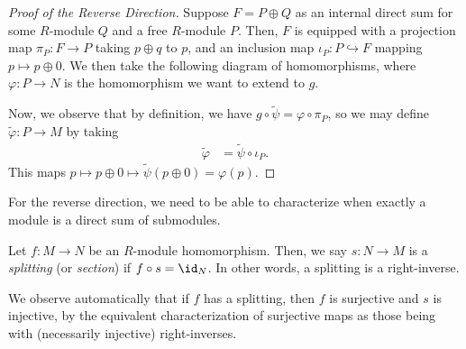 \documentclass[10pt]{mypackage}
\begin{document}
\begin{proof}[Proof of the Reverse Direction]
  Suppose $F = P\oplus Q$ as an internal direct sum for some $R$-module $Q$ and a free $R$-module $P$. Then, $F$ is equipped with a projection map $\pi_P\colon F\rightarrow P$ taking $p\oplus q$ to $p$, and an inclusion map $\iota_P\colon P\hookrightarrow F$ mapping $p\mapsto p\oplus 0$. We then take the following diagram of homomorphisms, where $\varphi\colon P\rightarrow N$ is the homomorphism we want to extend to $g$.
  \begin{center}
  \end{center}
  Now, we observe that by definition, we have $g\circ \widetilde{\psi} = \varphi\circ \pi_P$, so we may define $ \widetilde{\varphi}\colon P\rightarrow M $ by taking
  \begin{align*}
    \widetilde{\varphi} &= \widetilde{\psi}\circ \iota_P.
  \end{align*}
  This maps $p\mapsto p\oplus 0\mapsto \widetilde{\psi}\left( p\oplus 0 \right) = \varphi\left( p \right)$.
\end{proof}
For the reverse direction, we need to be able to characterize when exactly a module is a direct sum of submodules.
\begin{definition}
  Let $f\colon M\rightarrow N$ be an $R$-module homomorphism. Then, we say $s\colon N\rightarrow M$ is a \textit{splitting} (or \textit{section}) if $f\circ s = \id_{N}$. In other words, a splitting is a right-inverse.
\end{definition}
We observe automatically that if $f$ has a splitting, then $f$ is surjective and $s$ is injective, by the equivalent characterization of surjective maps as those being with (necessarily injective) right-inverses.
\end{document}
